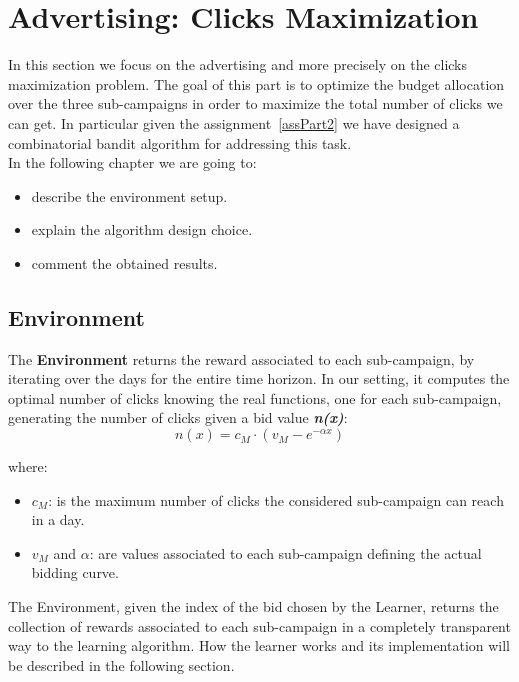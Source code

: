 \chapter{Advertising: Clicks Maximization}

In this section we focus on the advertising and more precisely on the clicks maximization problem.
The goal of this part is to optimize the budget allocation over the three sub-campaigns in order to maximize the total number of clicks we can get.
In particular given the assignment~\ref{assPart2} we have designed a combinatorial bandit algorithm for addressing this task.\\
In the following chapter we are going to:
\begin{itemize}
    \item describe the environment setup.
    \item explain the algorithm design choice.
    \item comment the obtained results.
\end{itemize}


\section{Environment}
The \textbf{Environment} returns the reward associated to each sub-campaign, by iterating over the days for the entire time horizon.
In our setting, it computes the optimal number of clicks knowing the real functions, one for each sub-campaign, generating the number of clicks given a bid value \textbf{\textit{n(x)}}:\\

\begin{equation}
    n(x) = c_{M} \cdot (v_{M} - e^{-\alpha x})
\end{equation}

where:
\begin{itemize}
    \item $c_{M}$: is the maximum number of clicks the considered sub-campaign can reach in a day.
    \item $v_{M}$ and $\alpha$: are values associated to each sub-campaign defining the actual bidding curve.
\end{itemize}


The Environment, given the index of the bid chosen by the Learner, returns the collection of rewards associated to each sub-campaign in a completely transparent way to the learning algorithm.
How the learner works and its implementation will be described in the following section.


